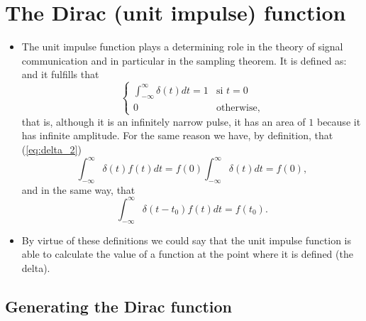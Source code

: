 \section{The Dirac (unit impulse) function}
\begin{itemize}
\item The unit impulse function \cite{Lathi} plays a determining role
  in the theory of signal communication and in particular in the
  sampling theorem. It is defined as:
  and it fulfills that
  \begin{equation}
    \left\{
      \begin{array}{ll}
        \displaystyle\int_{-\infty}^\infty\delta(t)dt=1 & \text{si $t=0$}\\
        0 & \text{otherwise,}
      \end{array}
    \right.
    \tag{delta\_1}
    \label{eq:delta_1}
  \end{equation}
  that is, although it is an infinitely narrow pulse, it has an area
  of $1$ because it has infinite amplitude. For the same reason we have,
  by definition, that (\ref{eq:delta_2})
  \begin{equation}
    \int_{-\infty}^\infty\delta(t)f(t)dt =
    f(0)\int_{-\infty}^\infty\delta(t)dt = f(0),
    \tag{delta\_2}
    \label{eq:delta_2}
  \end{equation}
  and in the same way, that
  \begin{equation}
    \int_{-\infty}^\infty\delta(t-t_0)f(t)dt = f(t_0).
    \tag{delta\_3}
    \label{eq:delta_3}
  \end{equation}
\item By virtue of these definitions we could say that the unit
  impulse function is able to calculate the value of a function at the
  point where it is defined (the delta).
\end{itemize}

\subsection{Generating the Dirac function}

